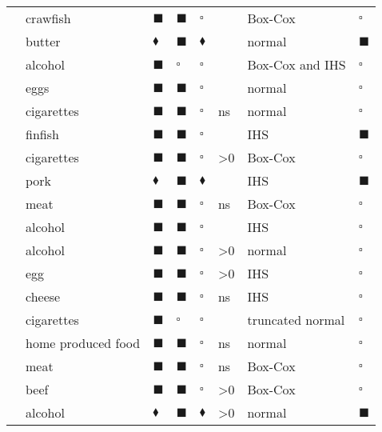 \begin{table}
\begin{threeparttable}
\begin{center}
\begin{footnotesize}
\begin{tabular}{llllllll}
  \cite{YEN:DELL:SCHUP:95} & crawfish & $\blacksquare$ & $\blacksquare$ & $\square$ &  & Box-Cox & $\square$ \\ 
  \cite{YEN:SU:95} & butter & $\blacklozenge$ & $\blacksquare$ & $\blacklozenge$ &  & normal & $\blacksquare$ \\ 
  \cite{YEN:95} & alcohol & $\blacksquare$ & $\square$ & $\square$ &  & Box-Cox and IHS & $\square$ \\ 
  \cite{WANG:JENS:YEN:96} & eggs & $\blacksquare$ & $\blacksquare$ & $\square$ &  & normal & $\square$ \\ 
  \cite{GARC:LABE:96} & cigarettes & $\blacksquare$ & $\blacksquare$ & $\square$ & ns & normal & $\square$ \\ 
  \cite{YEN:HUAN:96} & finfish & $\blacksquare$ & $\blacksquare$ & $\square$ &  & IHS & $\blacksquare$ \\ 
  \cite{YEN:JONE:96} & cigarettes & $\blacksquare$ & $\blacksquare$ & $\square$ & >0 & Box-Cox & $\square$ \\ 
  \cite{SU:YEN:96} & pork & $\blacklozenge$ & $\blacksquare$ & $\blacklozenge$ &  & IHS & $\blacksquare$ \\ 
  \cite{BURT:DORS:YOUN:96} & meat & $\blacksquare$ & $\blacksquare$ & $\square$ & ns & Box-Cox & $\square$ \\ 
  \cite{YEN:JENS:96} & alcohol & $\blacksquare$ & $\blacksquare$ & $\square$ &  & IHS & $\square$ \\ 
  \cite{WANG:GAO:WAIL:96} & alcohol & $\blacksquare$ & $\blacksquare$ & $\square$ & >0 & normal & $\square$ \\ 
  \cite{YEN:JENS:WANG:96} & egg & $\blacksquare$ & $\blacksquare$ & $\square$ & >0 & IHS & $\square$ \\ 
  \cite{YEN:JONE:97} & cheese & $\blacksquare$ & $\blacksquare$ & $\square$ & ns & IHS & $\square$ \\ 
  \cite{YEN:99} & cigarettes & $\blacksquare$ & $\square$ & $\square$ &  & truncated normal & $\square$ \\ 
  \cite{BERT:CAIL:NICH:99} & home produced food & $\blacksquare$ & $\blacksquare$ & $\square$ & ns & normal & $\square$ \\ 
  \cite{BURT:YOUN:00} & meat & $\blacksquare$ & $\blacksquare$ & $\square$ & ns & Box-Cox & $\square$ \\ 
  \cite{JONE:YEN:00} & beef & $\blacksquare$ & $\blacksquare$ & $\square$ & >0 & Box-Cox & $\square$ \\ 
  \cite{ANGU:GIL:GRAC:01} & alcohol & $\blacklozenge$ & $\blacksquare$ & $\blacklozenge$ & >0 & normal & $\blacksquare$ \\ 

\end{tabular}
\end{footnotesize}
\end{center}
\end{threeparttable}
\end{table}
